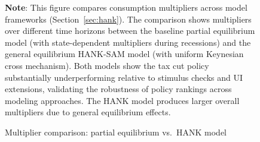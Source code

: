 \documentclass[\latexroot/\projectname]{subfiles}
\begin{document}
\begin{figure}[htb]
  \centering
  \caption{\pregenmark Multiplier comparison: partial equilibrium vs.\ HANK model}
  \whenintegrated{\label{fig:HANK_multipliers}} %

  \medskip
  \noindent\parbox{\textwidth}{\footnotesize
    \textbf{Note}: This figure compares consumption multipliers across model frameworks (Section~\ref{sec:hank}).
    The comparison shows multipliers over different time horizons
    between the baseline partial equilibrium model (with state-dependent multipliers during recessions)
    and the general equilibrium HANK-SAM model (with uniform Keynesian cross mechanism).
    Both models show the tax cut policy substantially underperforming relative to stimulus checks
    and UI extensions, validating the robustness of policy rankings across modeling approaches.
    The HANK model produces larger overall multipliers due to general equilibrium effects.
  }
\end{figure}

\vspace{0.5em}

\smartbib
\end{document}
